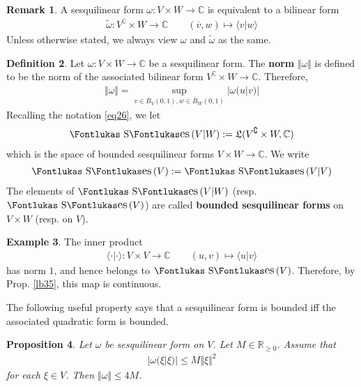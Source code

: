 \documentclass[12pt,b5paper,notitlepage]{article}
\theoremstyle{definition}
\newtheorem{df}{Definition}[subsection]
\newtheorem{eg}[df]{Example}
\newtheorem{rem}[df]{Remark}
\theoremstyle{plain}
\newtheorem{pp}[df]{Proposition}
\DeclareMathOperator{\Ses}{\text{\Fontlukas S}\text{\kern -0pt {\Fontlukas\large es}}\,}
\newcommand{\fk}{\mathfrak}
\newcommand{\wtd}{\widetilde}
\newcommand{\ovl}{\overline}
\newcommand{\bk}[1]{\langle {#1}\rangle}
\newcommand{\Co}{\complement}
\newcommand{\Cbb}{\mathbb C}
\newcommand{\Rbb}{\mathbb R}
\numberwithin{equation}{section}
\begin{document}
\begin{rem}
A sesquilinear form $\omega:V\times W\rightarrow \Cbb$ is equivalent to a bilinear form
\begin{align*}
\wtd\omega:V^\Co\times W\rightarrow\Cbb\qquad (\ovl v,w)\mapsto \bk{v|w}
\end{align*}
Unless otherwise stated, we always view $\omega$ and $\wtd\omega$ as the same.
\end{rem}

\begin{df}
Let $\omega:V\times W\rightarrow\Cbb$ be a sesquilinear form. The \textbf{norm}  $\Vert\omega\Vert$ is defined to be the norm of the associated bilinear form $V^\Co\times W\rightarrow\Cbb$. Therefore, 
\begin{align*}
\Vert\omega\Vert=\sup_{v\in\ovl B_V(0,1),w\in\ovl B_W(0,1)}|\omega(u|v)|
\end{align*}
Recalling the notation \eqref{eq26}, we let \index{Sesq@$\Ses(V\vert W)$ and $\Ses(V)$}
\begin{align*}
\Ses(V|W):=\fk L(V^\Co\times W,\Cbb)
\end{align*}
which is the space of bounded sesquilinear forms $V\times W\rightarrow\Cbb$. We write
\begin{align*}
\Ses(V):=\Ses(V|V)
\end{align*}
The elements of $\Ses(V|W)$ (resp. $\Ses(V)$) are called \textbf{bounded sesquilinear forms}  on $V\times W$ (resp. on $V$).
\end{df}


\begin{eg}\label{lb125}
The inner product
\begin{align*}
\bk{\cdot|\cdot}:V\times V\rightarrow\Cbb\qquad (u,v)\mapsto\bk{u|v}
\end{align*}
has norm $1$, and hence belongs to $\Ses(V)$. Therefore, by Prop. \ref{lb35}, this map is continuous.
\end{eg}

The following useful property says that a sesquilinear form is bounded iff the associated quadratic form is bounded.

\begin{pp}\label{lb238}
Let $\omega$ be sesquilinear form on $V$. Let $M\in\Rbb_{\geq0}$. Assume that
\begin{align*}
|\omega(\xi|\xi)|\leq M\Vert\xi\Vert^2
\end{align*}
for each $\xi\in V$. Then $\Vert\omega\Vert\leq 4M$.
\end{pp}
\end{document}
